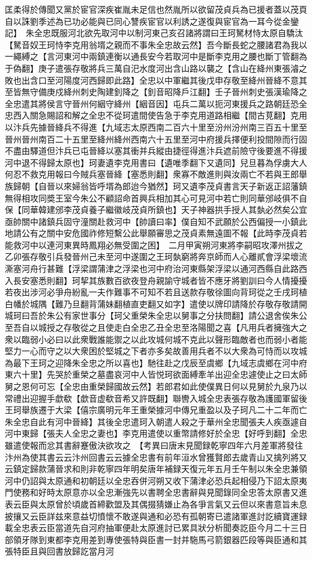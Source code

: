 匡柔得於傳聞又黨於宦官深疾崔胤未足信也然胤所以欲留茂貞兵為已援者蓋以茂頁自以誅劉季述為已功必能與已同心讐疾宦官以利誘之遂復與宦官為一耳今從金鑾記】　朱全忠既服河北欲先取河中以制河東己亥召諸將謂曰王珂駑材恃太原自驕汰【駑音奴王珂恃李克用翁壻之親而不事朱全忠故云然】吾今斷長蛇之腰諸君為我以一繩縛之【言河東河中兩鎮連衡以通長安今若取河中是斷李克用之腰也斷丁管翻為于偽翻】庚子遣張存敬將兵三萬自汜水度河出含山路以襲之【含山在絳州東張濬之敗也出含口至河陽度河西歸即此路】全忠以中軍繼其後戊申存敬至絳州晉絳不意其至皆無守備庚戍絳州刺史陶建釗降之【釗音昭降戶江翻】壬子晉州刺史張漢瑜降之全忠遣其將侯言守晉州何絪守絳州【絪音因】屯兵二萬以扼河東援兵之路朝廷恐全忠西入關急賜詔和解之全忠不從珂遣間使告急于李克用道路相繼【間古莧翻】克用以汴兵先據晉絳兵不得進【九域志太原西南二百六十里至汾州汾州南三百五十里至晉州晉州南百二十五里至絳州絳州西南六十五里至河中府援兵擇便利投間隙而行固不盡由驛道但汴兵已屯晉絳以塞其衝并兵縱由捷徑得進汴兵遮前險守後要進不得援河中退不得歸太原也】珂妻遺李克用書曰【遺唯季翻下又遺同】兒旦暮為俘虜大人何忍不救克用報曰今賊兵塞晉絳【塞悉則翻】衆寡不敵進則與汝兩亡不若與王郎舉族歸朝【自晉以來婦翁皆呼壻為郎迨今猶然】珂又遺李茂貞書言天子新返正詔藩鎮無得相攻同奬王室今朱公不顧詔命首興兵相加其心可見河中若亡則同華邠岐俱不自保【同華韓建邠李茂貞養子繼徽岐茂貞所鎮也】天子神器拱手授人其埶必然矣公宜亟帥關中諸鎮兵固守潼關赴救河中【帥讀曰率】僕自知不武願於公西偏授一小鎮此地請公有之關中安危國祚修短繫公此舉願審思之茂貞素無遠圖不報【此時李茂貞若能救河中以連河東異時鳳翔必無受圍之困】　二月甲寅朔河東將李嗣昭攻澤州拔之乙卯張存敬引兵發晉州己未至河中遂圍之王珂埶窮將奔京師而人心離貳會浮梁壞流澌塞河舟行甚難【浮梁謂蒲津之浮梁也河中府治河東縣架浮梁以通河西縣自此路西入長安塞悉則翻】珂挈其族數百欲夜登舟親諭守城者皆不應牙將劉訓曰今人情擾擾若夜出涉河必爭舟紛亂一夫作難事不可知不若且送款存敬徐圖向背珂從之壬戌珂植白幡於城隅【難乃旦翻背蒲妹翻植直吏翻又如字】遣使以牌印請降於存敬存敬請開城珂曰吾於朱公有家世事分【珂父重榮朱全忠以舅事之分扶問翻】請公退舍俟朱公至吾自以城授之存敬從之且使走白全忠乙丑全忠至洛陽聞之喜【凡用兵者擁強大之衆以臨弱小必曰以此衆戰誰能禦之以此攻城何城不克此以聲形臨敵者也而弱小者能堅力一心而守之以大衆困於堅城之下者亦多矣故善用兵者不以大衆為可恃而以攻城為最下王珂之迎降朱全忠之所以喜也】馳往赴之戊辰至虞鄉【九域志虞鄉在河中府東六十里】先哭於重榮之墓盡哀河中人皆悦珂欲面縛牽羊出迎全忠遽使止之曰太師舅之恩何可忘【全忠由重榮歸國故云然】若郎君如此使僕異日何以見舅於九泉乃以常禮出迎握手歔欷【歔音虚欷音希又許既翻】聯轡入城全忠表張存敬為護國軍留後王珂舉族遷于大梁【僖宗廣明元年王重榮據河中傳兄重盈以及子珂凡二十二年而亡朱全忠自此有河中晉絳】其後全忠遣珂入朝遣人殺之于華州全忠聞張夫人疾亟遽自河中東歸【張夫人全忠之妻也】李克用遣使以重幣請修好於全忠【好呼到翻】全忠雖遣使報而忿其書辭蹇傲決欲攻之　【考異曰唐末見聞録乾寧四年六月差軍將發往汴州為使其書云云汴州回書云云據全忠書有前年洹水曾獲賢郎去歲青山又擒列將又云鎮定歸款蒲晉求和則非乾寧四年明矣唐年補録天復元年五月壬午制以朱全忠兼領河中仍詔與太原通和初朝廷以全忠吞併河朔又收下蒲津必恐兵起相侵乃下詔太原夷門使務和好時太原意亦以全忠漸強先以書聘全忠書辭與見聞錄同全忠答太原書又進表云臣與太原曾於頃歲首締歡盟及其偶掇猜嫌止為各爭言氣又云但以來書意旨未息披攘又云臣詳兹來意益切憤懷不敢遂與通和必恐有孤朝寄已遣諸軍進討訖續寶運録載全忠表云臣當道先自河府抽軍便赴太原進討已累具狀分析聞奏訖臣今月二十三日部領牙隊到東都李克用差到專使張特與臣書一封并駞馬弓箭銀器匹段等與臣通和其張特臣且與回書放歸訖當月河